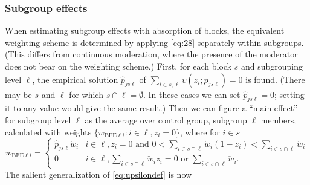 \documentclass{article}
\newcommand{\owt}[1][{[z_{i}]}]{\ensuremath{\check{w}_{i#1}}}
\newcommand{\absorbInterceptsEF}{\upsilon}
\begin{document}
\subsubsection{Subgroup effects}
When estimating subgroup effects with absorption of blocks,
the equivalent weighting scheme is determined by applying
\eqref{eq:28} separately within subgroups.  (This differs from
continuous moderation, where the presence of the moderator does not
bear on the weighting scheme.) First, for each block $s$
and subgrouping level $\ell$, the empirical solution
$\hat{p}_{js\ell}$  of $\sum_{i \in s, \ell}
\absorbInterceptsEF (z_{i}; p_{js\ell})=0$ is found.
(There may be $s$ and $\ell$ for which $s \cap \ell = \emptyset$. In
these cases we can set $\hat{p}_{js\ell}=0$; setting it to any value
would give the same result.)  Then we can figure a ``main effect'' for
subgroup level $\ell$ as the average over control group, subgroup
$\ell$ members, calculated with weights $\{w_{\text{BFE} \ell i}: i
\in \ell, z_{i}=0\}$, where for $i \in s$ 
\begin{equation*}
  w_{\text{BFE} \ell i} =
  \begin{cases}
    \hat{p}_{js\ell} \owt[] & i \in \ell, z_i =0 \text{ and } 0 < \sum_{i
  \in s\cap \ell} \owt[] (1-z_{i})< \sum_{i \in s\cap \ell} \owt[]\\
0 &  i \in \ell, \sum_{i \in s\cap \ell} \owt[] z_{i} = 0 \text{ or }
  \sum_{i \in s\cap \ell} \owt[].
  \end{cases}
\end{equation*}
The salient generalization of \eqref{eq:upsilondef} is now
\end{document}
